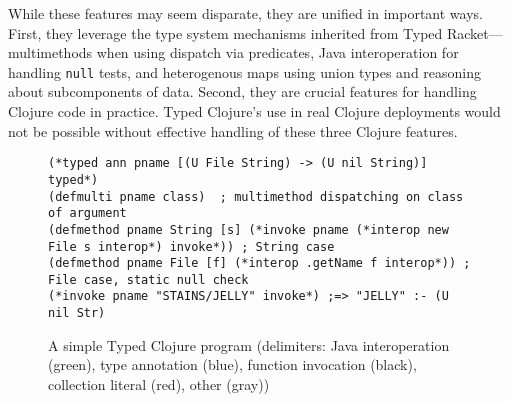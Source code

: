 While these features may seem disparate, they are unified in important
ways. First, they leverage the type system mechanisms
inherited from Typed Racket---multimethods when using 
dispatch via predicates, Java interoperation for handling
\texttt{null} tests, and heterogenous maps using union types and
reasoning about subcomponents of data. Second,
they are crucial features for handling Clojure code in
practice. Typed Clojure's use in real Clojure deployments would not be
possible without effective handling of these three Clojure features. 

\begin{figure*}[t!]
\begin{lstlisting}
(*typed ann pname [(U File String) -> (U nil String)] typed*)
(defmulti pname class)  ; multimethod dispatching on class of argument
(defmethod pname String [s] (*invoke pname (*interop new File s interop*) invoke*)) ; String case 
(defmethod pname File [f] (*interop .getName f interop*)) ; File case, static null check
(*invoke pname "STAINS/JELLY" invoke*) ;=> "JELLY" :- (U nil Str)
\end{lstlisting}
\caption{A simple Typed Clojure program (delimiters: {\color{interop}Java interoperation (green)}, 
  {\color{types}type annotation (blue)},
  {\color{invoke}function invocation (black)}, {\color{red}collection literal (red)}, {\color{mygray}other (gray)})}
\label{fig:ex1}
\end{figure*}



